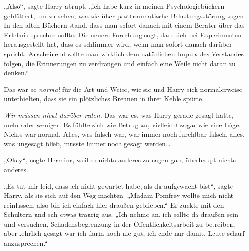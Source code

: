 „Also“, sagte Harry abrupt, „ich habe kurz in meinen Psychologiebüchern geblättert, um zu sehen, was sie über posttraumatische Belastungsstörung sagen. In den alten Büchern stand, dass man sofort danach mit einem Berater über das Erlebnis sprechen sollte. Die neuere Forschung sagt, dass sich bei Experimenten herausgestellt hat, dass es schlimmer wird, wenn man sofort danach darüber spricht. Anscheinend sollte man wirklich dem natürlichen Impuls des Verstandes folgen, die Erinnerungen zu verdrängen und einfach eine Weile nicht daran zu denken.“

Das war so \emph{normal} für die Art und Weise, wie sie und Harry sich normalerweise unterhielten, dass sie ein plötzliches Brennen in ihrer Kehle spürte.

\emph{Wir müssen nicht darüber reden.} Das war es, was Harry gerade gesagt hatte, mehr oder weniger. Es fühlte sich wie Betrug an, vielleicht sogar wie eine Lüge. Nichts war normal. Alles, was falsch war, war immer noch furchtbar falsch, alles, was ungesagt blieb, musste immer noch gesagt werden…

„Okay“, sagte Hermine, weil es nichts anderes zu sagen gab, überhaupt nichts anderes.

„Es tut mir leid, dass ich nicht gewartet habe, als du aufgewacht bist“, sagte Harry, als sie sich auf den Weg machten. „Madam Pomfrey wollte mich nicht reinlassen, also bin ich einfach hier draußen geblieben.“ Er zuckte mit den Schultern und sah etwas traurig aus. „Ich nehme an, ich sollte da draußen sein und versuchen, Schadensbegrenzung in der Öffentlichkeitsarbeit zu betreiben, aber…ehrlich gesagt war ich darin noch nie gut, ich ende nur damit, Leute scharf anzusprechen.“

